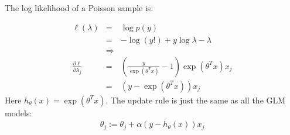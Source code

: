 \begin{answer}

The log likelihood of a Poisson sample is:

\begin{eqnarray*}
\ell(\lambda) 
    &=& \log p(y) \\
    &=& - \log(y!) + y\log \lambda - \lambda \\
    &\Rightarrow& \\
\frac{\partial \ell}{\partial \lambda_j}
    &=& (\frac{y}{\exp(\theta^T x)}-1) \exp(\theta^T x) x_j \\
    &=& (y - \exp(\theta^T x))x_j
\end{eqnarray*}
Here $h_{\theta}(x)=\exp (\theta^T x)$. 
The update rule is just the same as all the GLM models:
\begin{eqnarray*}
    \theta_j := \theta_j + \alpha (y-h_{\theta}(x)) x_j
\end{eqnarray*}

\end{answer}

